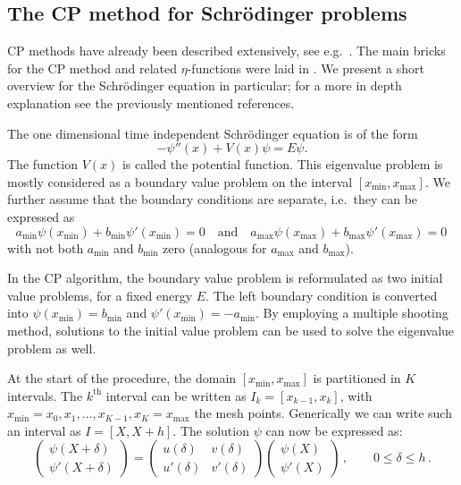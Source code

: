 \subsection{The CP method for Schrödinger problems}\label{the-method}

CP methods have already been described extensively, see e.g.\ \cite{ixaru_numerical_1984,ixaru_cp_1998,ixaru_cp_2000,ledoux_cp_2004}. The main bricks for the CP method and related $\eta$-functions were laid in \cite{ixaru_numerical_1984}. We present a short overview for the Schrödinger equation in particular; for a more in depth explanation see the previously mentioned references.

The one dimensional time independent Schrödinger equation is of the form
\[
  -\psi''(x) + V(x)\psi = E\psi\text{.}
\] The function $V(x)$ is called the potential function.
This eigenvalue problem is mostly considered as a boundary value problem on
the interval \([x_\text{min}, x_\text{max}]\). We further assume that the boundary
conditions are separate, i.e.\ they can be expressed as
\[
  a_\text{min} \psi(x_\text{min}) + b_\text{min}\psi'(x_\text{min}) = 0
  \quad \mbox{and} \quad
  a_\text{max} \psi(x_\text{max}) + b_\text{max}\psi'(x_\text{max}) = 0\,
\]
with not both $a_\text{min}$ and $b_\text{min}$ zero (analogous for $a_\text{max}$ and $b_\text{max}$).

In the CP algorithm, the boundary value problem is reformulated as two initial value problems, for a fixed
energy \(E\). The left boundary condition is converted into
\(\psi(x_\text{min}) = b_\text{min} \) and \(\psi'(x_\text{min}) = -a_\text{min}\). By
employing a multiple shooting method, solutions to the initial value
problem can be used to solve the eigenvalue problem as well.

At the start of the procedure, the domain \([x_\text{min}, x_\text{max}]\) is partitioned in \(K\)
intervals. The \(k^\text{th}\) interval can be written as
\(I_k = [x_{k-1}, x_{k}]\), with
\(x_\text{min} = x_0, x_1, \dots, x_{K-1}, x_{K} = x_\text{max}\) the
mesh points. Generically we can write such an interval as \(I = [X, X+h]\).
The solution \(\psi\) can now be expressed as:
\begin{equation}
  \begin{pmatrix}\psi(X+\delta) \\ \psi'(X+\delta)\end{pmatrix}
  = \begin{pmatrix} u(\delta) & v(\delta) \\ u'(\delta) & v'(\delta) \end{pmatrix} \begin{pmatrix} \psi(X) \\ \psi'(X) \end{pmatrix} \,, \qquad %
  0 \leq \delta \leq h \,. \label{eq:propmatrix}
\end{equation}

